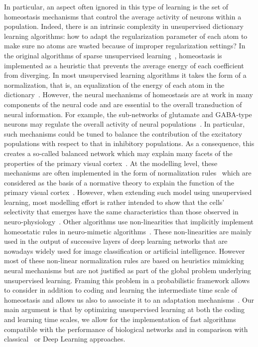 \documentclass[letterpaper,final,conference,10pt]{IEEEtran}
\newcommand{\citep}[1]{\cite{#1}}
\begin{document}
In particular, an aspect often ignored in this type of learning is the set of homeostasis mechanisms that control the average  activity of neurons within a population. Indeed, there is an intrinsic complexity in unsupervised dictionary learning algorithms: how to adapt the regularization parameter of each atom to make sure no atoms are wasted because of improper regularization settings? In the original algorithms of sparse unsupervised learning~\citep{Olshausen97}, homeostasis is implemented as a heuristic that prevents the average energy of each coefficient from diverging. In most unsupervised learning algorithms it takes the form of a normalization, that is, an equalization of the energy of each atom in the dictionary~\citep{Mairal14}. However, the neural mechanisms of homeostasis are at work in many components of the neural code and are essential to the overall transduction of neural information. For example, the sub-networks of glutamate and GABA-type neurons may regulate the overall activity of neural populations~\citep{Marder2006variability}. In particular, such mechanisms could be tuned to balance the contribution of the excitatory populations with respect to that in inhibitory populations. As a consequence, this creates a so-called balanced network which may explain many facets of the properties of the primary visual cortex~\citep{Hansel12}. At the modelling level, these mechanisms are often implemented in the form of normalization rules~\citep{Schwartz01} which are considered as the basis of a normative theory to explain the function of the primary visual cortex~\citep{Carandini12}. However, when extending such model using unsupervised learning, most modelling effort is rather intended to show that the cells' selectivity that emerges have the same characteristics than those observed in neuro-physiology~\citep{Ringach02,Rehn07, Loxley17}. Other algorithms use non-linearities that implicitly implement homeostatic rules in neuro-mimetic algorithms~\citep{Brito16}. These non-linearities are mainly used in the output of successive layers of deep learning networks that are nowadays widely used for image classification or artificial intelligence. However most of these non-linear normalization rules are based on heuristics mimicking neural mechanisms but are not justified as part of the global problem underlying unsupervised learning. Framing this problem in a probabilistic framework allows to consider in addition to coding and learning the intermediate time scale of homeostasis and allows us also to associate it to an adaptation mechanisms~\citep{Rao99}. Our main argument is that by optimizing unsupervised learning at both the coding and learning time scales, we allow for the implementation of fast algorithms compatible with the performance of biological networks and in comparison with classical~\citep{Olshausen97} or Deep Learning approaches.
\end{document}
